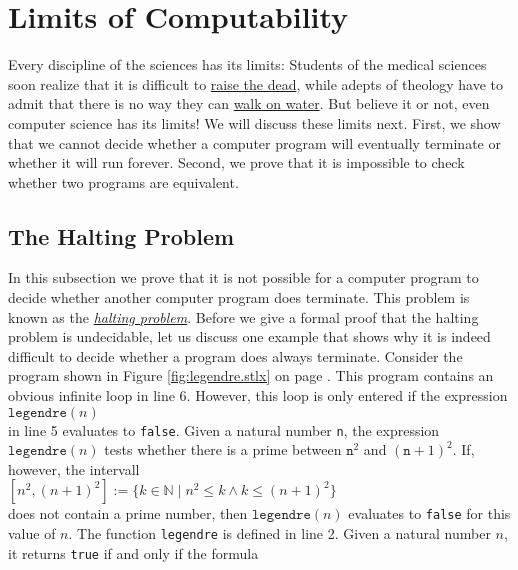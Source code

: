 \chapter{Limits of Computability}
Every discipline of the sciences has its limits: Students of the medical sciences soon realize that
it is difficult to \href{http://www.wowhead.com/spell=61999}{raise the dead}, while
adepts of theology have to admit that there is no way they 
can \href{http://www.youtube.com/watch?v=RUMX_b_m3Js}{walk on water}.  But believe it or not, even
computer science has its limits!  We will discuss 
these limits next.  First, we show that we cannot decide whether a computer program will eventually
terminate or whether it will run forever.  
Second, we prove that it is impossible to check whether two programs are equivalent.


\section{The Halting Problem}
In this subsection we prove that it is not possible for a computer program to decide whether 
another computer program does terminate.  This problem is known as the 
\href{http://en.wikipedia.org/wiki/Halting_problem}{\emph{halting problem}}.
Before we give a formal proof that the halting problem is undecidable, let us
discuss one example that shows why it is indeed difficult to decide whether a program does always
terminate.  Consider the program shown in Figure \ref{fig:legendre.stlx} on page
\pageref{fig:legendre.stlx}.  This program contains an obvious infinite loop in line 6.   However,
this loop is only entered if the expression
\\[0.2cm]
\hspace*{1.3cm}
$\mathtt{legendre}(n)$
\\[0.2cm]
in line 5 evaluates to \texttt{false}.  Given a natural number \texttt{n}, the expression
$\texttt{legendre}(n)$ tests whether there is a prime between $\texttt{n}^2$ and $(\texttt{n}+1)^2$.  
If, however, the intervall
\\[0.2cm]
\hspace*{1.3cm}
$[n^2, (n+1)^2] := \{ k \in \mathbb{N} \mid n^2 \leq k \wedge k \leq (n+1)^2 \}$
\\[0.2cm]
does not contain a prime number, then $\texttt{legendre}(n)$ evaluates
to \texttt{false} for this value of $n$.  The function \texttt{legendre} is defined in line 2.  
Given a natural number $n$, it returns \texttt{true} if and only if the formula
\\[0.2cm]
